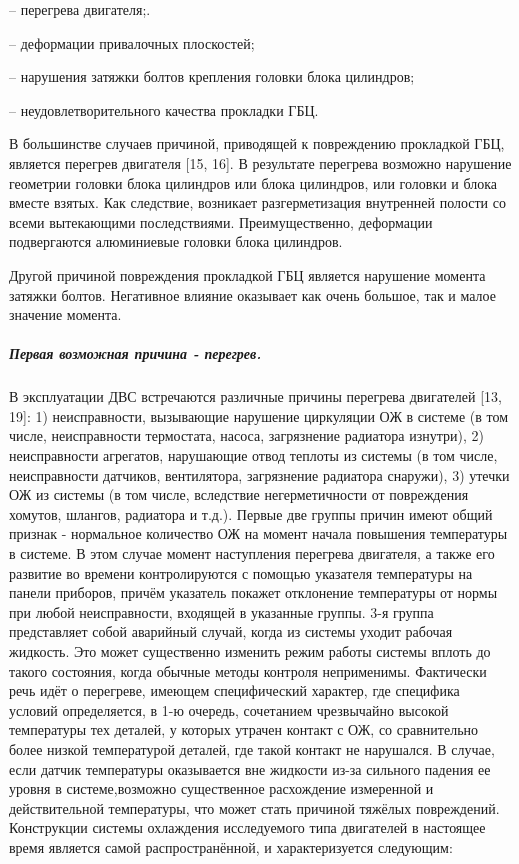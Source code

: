 \begin{compactlist}
    \item [--] перегрева двигателя;.
    \item [--] деформации привалочных  плоскостей;  
    \item [--] нарушения затяжки болтов крепления головки блока цилиндров;
    \item [--] неудовлетворительного качества  прокладки ГБЦ.
\end{compactlist}


В большинстве случаев причиной, приводящей к повреждению прокладкой ГБЦ, является  перегрев двигателя [15, 16]. В результате перегрева возможно нарушение геометрии головки блока цилиндров или блока цилиндров, или головки и блока вместе взятых.  Как следствие, возникает разгерметизация внутренней полости со всеми вытекающими последствиями. Преимущественно, деформации подвергаются алюминиевые  головки блока цилиндров.

Другой причиной повреждения прокладкой ГБЦ является нарушение момента затяжки болтов. Негативное влияние оказывает как очень большое, так и малое значение момента. 

\subparagraph{Первая возможная причина - перегрев.}
В эксплуатации ДВС встречаются различные  причины перегрева двигателей [13, 19]:
1)	неисправности, вызывающие нарушение циркуляции ОЖ в системе (в том числе, неисправности термостата, насоса, загрязнение радиатора изнутри),
2)	неисправности агрегатов, нарушающие отвод теплоты из системы (в том числе, неисправности датчиков, вентилятора, загрязнение радиатора снаружи),
3)	утечки ОЖ из системы (в том числе, вследствие негерметичности от повреждения хомутов, шлангов, радиатора и т.д.).
Первые две группы причин имеют общий признак - нормальное количество ОЖ на момент начала повышения температуры в системе. В этом случае момент наступления перегрева двигателя, а также его развитие во времени контролируются с помощью указателя температуры на панели приборов, причём указатель покажет отклонение температуры от нормы при любой неисправности, входящей в указанные группы.
3-я группа представляет собой аварийный случай, когда из системы уходит рабочая жидкость. Это может существенно изменить режим работы системы вплоть до такого состояния, когда обычные методы контроля неприменимы.
Фактически речь идёт о перегреве, имеющем специфический характер, где специфика условий определяется, в 1-ю очередь, сочетанием чрезвычайно высокой температуры тех деталей, у которых утрачен контакт с ОЖ, со сравнительно более низкой температурой деталей, где такой контакт не нарушался. В случае, если датчик температуры оказывается вне жидкости из-за сильного падения ее уровня в системе,возможно существенное расхождение измеренной и действительной температуры, что  может стать причиной тяжёлых повреждений.\\
Конструкции системы охлаждения  исследуемого типа двигателей в настоящее время является самой распространённой, и
характеризуется следующим:
 
